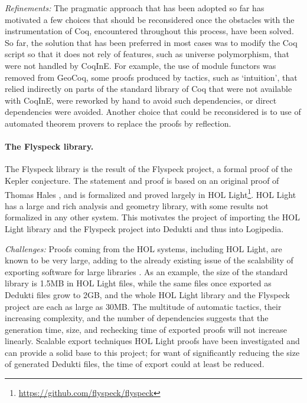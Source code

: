 \emph{Refinements:}
The pragmatic approach that has been adopted so far has motivated a
few choices that should be reconsidered once the obstacles with the instrumentation of Coq,
encountered throughout this process, have been solved. So far, the solution that
has been preferred in most cases was to modify the Coq script so that
it does not rely of features, such as universe polymorphism, that were
not handled by CoqInE. For
example, the use of module functors was removed from GeoCoq, some
proofs produced by tactics, such as `intuition', that relied indirectly on
parts of the standard library of Coq that were not available with
CoqInE, were reworked by hand to avoid such dependencies, or direct
dependencies were avoided. Another choice that could be reconsidered
is to use of automated theorem provers to replace the proofs by reflection.

\paragraph*{The Flyspeck library.}

The Flyspeck library
is the result of the Flyspeck
project, a formal proof of the Kepler conjecture. The statement and
proof is based on an original proof of Thomas Hales
\cite{DBLP:journals/corr/HalesABDHHKMMNNNOPRSTTTUVZ15}, and is
formalized and proved largely in HOL
Light\footnote{\url{https://github.com/flyspeck/flyspeck}}. HOL Light
has a large and rich analysis and geometry library, with some results
not formalized in any other system. This motivates the project of
importing the HOL Light library and the Flyspeck project into
Dedukti and thus into Logipedia.

\emph{Challenges:}
Proofs coming from the HOL systems, including {HOL Light}, are known to
be very large, adding to the already existing issue of the scalability of
exporting software for large libraries
\cite{DBLP:conf/tphol/Wong95,DBLP:conf/cade/ObuaS06,DBLP:conf/itp/KellerW10,
DBLP:conf/cade/Kumar13}. As an example, the size of the standard library is
1.5MB in {HOL Light} files, while the same files once
exported as {Dedukti} files grow to 2GB, and the whole
{HOL Light} library and the {Flyspeck} project are each as
large as 30MB. The multitude of automatic tactics, their increasing
complexity, and the number of dependencies suggests that the generation time, size,
and rechecking time of exported proofs will not increase linearly. Scalable
export techniques {HOL Light} proofs have been investigated
\cite{KaliszykK13} and can provide a solid base to
this project; for want of significantly reducing the size of generated
{Dedukti} files, the time of export could at least be reduced.

